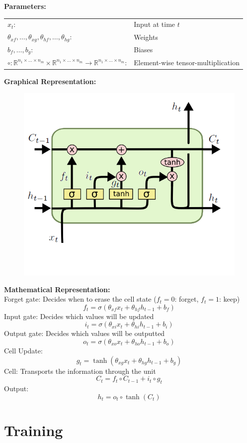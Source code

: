 \documentclass[10pt,a4paper]{article}
\begin{document}
\textbf{Parameters:} \\
\begin{tabular}{ll}
	$x_t$: & Input at time $t$ \\
	$\theta_{xf}, \dots, \theta_{xg},\theta_{hf}, \dots, \theta_{hg}$: & Weights \\
	$b_f, \dots, b_g$: & Biases \\
	$\circ : \mathbb R^{n_1 \times \dots \times n_m} \times \mathbb R^{n_1 \times \dots \times n_m} → \mathbb R^{n_1 \times \dots \times n_m}$: & Element-wise tensor-multiplication
\end{tabular}

\textbf{Graphical Representation:}
\begin{figure}[H]
	\includegraphics[width=0.7\columnwidth]{figures/lstm_3.png}
\end{figure}

\textbf{Mathematical Representation:} \\
Forget gate: Decides when to erase the cell state ($f_t = 0$: forget, $f_t = 1$: keep)
$$
	f_t = \sigma(\theta_{xf} x_t + \theta_{hf} h_{t-1} + b_f)
$$
Input gate: Decides which values will be updated
$$
	i_t = \sigma(\theta_{xi} x_t + \theta_{hi} h_{t-1} + b_i)
$$
Output gate: Decides which values will be outputted
$$
	o_t = \sigma(\theta_{xo} x_t + \theta_{ho} h_{t-1} + b_o)
$$
Cell Update:
$$
	g_t = \tanh(\theta_{xg} x_t + \theta_{hg} h_{t-1} + b_g)
$$
Cell: Transports the information through the unit
$$
	C_t = f_t \circ C_{t-1} + i_t \circ g_t
$$
Output:
$$
	h_t = o_t \circ \tanh(C_t)
$$





\pagebreak
\section{Training}
\end{document}
